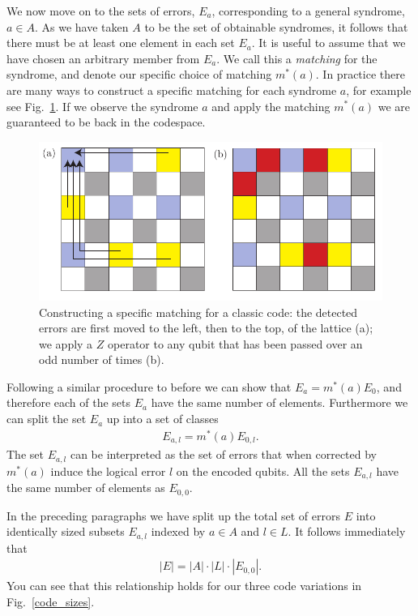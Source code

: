 We now move on to the sets of errors, $E_a$, corresponding to a general syndrome, $a \in A$. As we have taken $A$ to be the set of obtainable syndromes, it follows that there must be at least one element in each set $E_a$. It is useful to assume that we have chosen an arbitrary member from $E_a$. We call this a \textit{matching} for the syndrome, and denote our specific choice of matching $m^*(a)$. In practice there are many ways to construct a specific matching for each syndrome $a$, for example see Fig.~\ref{matching}. If we observe the syndrome $a$ and apply the matching $m^*(a)$ we are guaranteed to be back in the codespace.

\begin{figure}[htb]
  \begin{center}
    \includegraphics{figures/matching.pdf}
  \end{center}
  \caption{Constructing a specific matching for a classic code: the detected errors are first moved to the left, then to the top, of the lattice (a); we apply a $Z$ operator to any qubit that has been passed over an odd number of times (b).}
  \label{matching}
\end{figure}

Following a similar procedure to before we can show that $E_a = m^*(a) E_0$, and therefore each of the sets $E_a$ have the same number of elements. Furthermore we can split the set $E_a$ up into a set of classes
\begin{align}
  E_{a,l} = m^*(a) E_{0, l}.
\end{align}
The set $E_{a,l}$ can be interpreted as the set of errors that when corrected by $m^*(a)$ induce the logical error $l$ on the encoded qubits. All the sets $E_{a, l}$ have the same number of elements as $E_{0,0}$.

In the preceding paragraphs we have split up the total set of errors $E$ into identically sized subsets $E_{a, l}$ indexed by $a\in A$ and $l\in L$. It follows immediately that
\begin{align}
  |E| = |A| \cdot |L| \cdot |E_{0,0}|.
\end{align}
You can see that this relationship holds for our three code variations in Fig.~\ref{code_sizes}.


